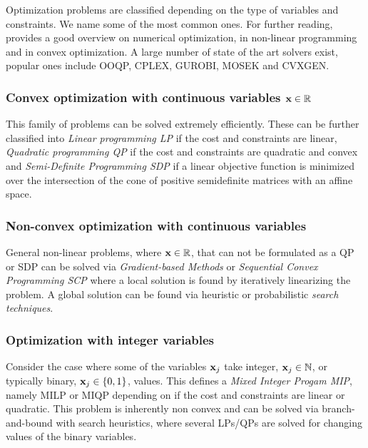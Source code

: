 Optimization problems are classified depending on the type of variables and constraints. We name some of the most common ones. For further reading, \citet{Nocedal:2006uv} provides a good overview on numerical optimization, \citet{Bertsekas:1999ua} in non-linear programming and \citet{Boyd:2004uz} in convex optimization. A large number of state of the art solvers exist, popular ones include OOQP, CPLEX, GUROBI, MOSEK and CVXGEN.

\subsubsection{Convex optimization with continuous variables $\textbf{x} \in \mathbb{R}$}
This family of problems can be solved extremely efficiently.
These can be further classified into \emph{Linear programming LP} if the cost and constraints are linear,
\emph{Quadratic programming QP} if the cost and constraints are quadratic and convex and \emph{Semi-Definite Programming SDP} if a linear objective function is minimized over the intersection of the cone of positive semidefinite matrices with an affine space.

\subsubsection{Non-convex optimization with continuous variables}
General non-linear problems, where $\textbf{x} \in \mathbb{R}$, that can not be formulated as a QP or SDP can be solved via \emph{Gradient-based Methods} or \emph{Sequential Convex Programming SCP} where a local solution is found by iteratively linearizing the problem. A global solution can be found via heuristic or probabilistic \emph{search techniques}.  

\subsubsection{Optimization with integer variables}
Consider the case where some of the variables $\textbf{x}_j$ take integer, $\textbf{x}_j \in \mathbb{N}$, or typically binary, $\textbf{x}_j \in \{0,1\}$, values.
This defines a \emph{Mixed Integer Progam MIP}, namely MILP or MIQP depending on if the cost and constraints are linear or quadratic. This problem is inherently non convex and can be solved via branch-and-bound with search heuristics, where several LPs/QPs are solved for changing values of the binary variables.



